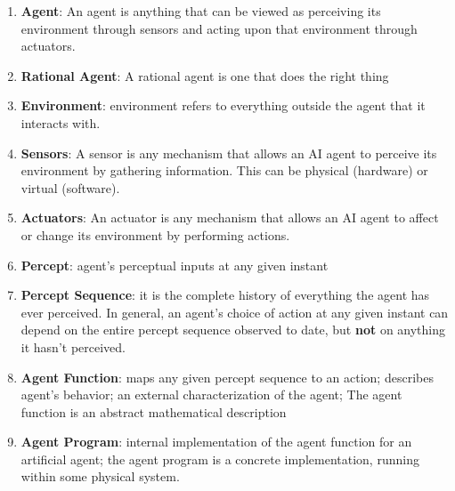\begin{enumerate}[itemsep=0.2cm]
    \item \textbf{Agent}: An agent is anything that can be viewed as perceiving its environment through sensors and acting upon that environment through actuators.
    \hfill \cite{ai/book/Artificial-Intelligence-A-Modern-Approach/Russell-Norvig}

    \item \textbf{Rational Agent}: A rational agent is one that does the right thing
    \hfill \cite{ai/book/Artificial-Intelligence-A-Modern-Approach/Russell-Norvig}
    

    \item \textbf{Environment}: environment refers to everything outside the agent that it interacts with.
    \hfill \cite{common/online/chatgpt}

    \item \textbf{Sensors}: A sensor is any mechanism that allows an AI agent to perceive its environment by gathering information. This can be physical (hardware) or virtual (software).
    \hfill \cite{common/online/chatgpt}

    \item \textbf{Actuators}: An actuator is any mechanism that allows an AI agent to affect or change its environment by performing actions.
    \hfill \cite{common/online/chatgpt}

    \item \textbf{Percept}: agent’s perceptual inputs at any given instant
    \hfill \cite{ai/book/Artificial-Intelligence-A-Modern-Approach/Russell-Norvig}
    
    \item \textbf{Percept Sequence}: it is the complete history of everything the agent has ever perceived. In general, an agent’s choice of action at any given instant can depend on the entire percept sequence observed to date, but \textbf{not} on anything it hasn’t perceived.
    \hfill \cite{ai/book/Artificial-Intelligence-A-Modern-Approach/Russell-Norvig}

    \item \textbf{Agent Function}: maps any given percept sequence to an action; describes agent’s behavior; an external characterization of the agent; The agent function is an abstract mathematical description
    \hfill \cite{ai/book/Artificial-Intelligence-A-Modern-Approach/Russell-Norvig}

    \item \textbf{Agent Program}: internal implementation of the agent function for an artificial agent; the agent program is a concrete implementation, running within some physical system.
    \hfill \cite{ai/book/Artificial-Intelligence-A-Modern-Approach/Russell-Norvig}
\end{enumerate}

